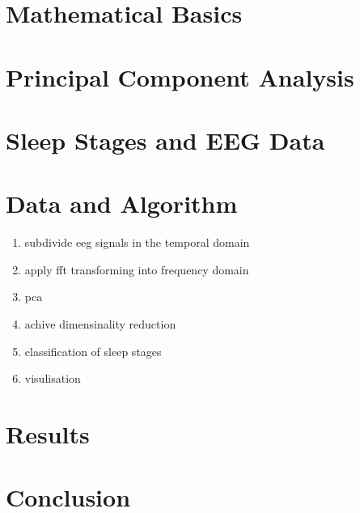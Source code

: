 \documentclass[a4paper]{IEEEtran}
\begin{document}
\section{Mathematical Basics}

\section{Principal Component Analysis}

\section{Sleep Stages and EEG Data}

\section{Data and Algorithm}
\begin{enumerate}
	\item subdivide eeg signals in the temporal domain
	\item apply fft transforming into frequency domain
	\item pca
	\item achive dimensinality reduction
	\item classification of sleep stages
	\item visulisation
\end{enumerate}



\section{Results}

\section{Conclusion}




\end{document}

